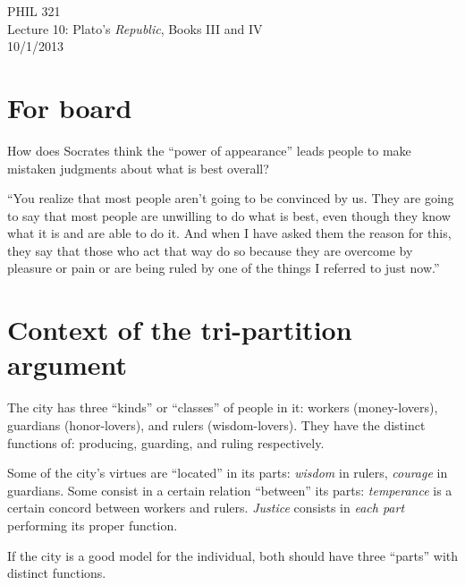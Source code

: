 \documentclass[11pt]{article}
\begin{document}
\thispagestyle{empty}
\begin{center} \LARGE{PHIL 321\\ Lecture 10: Plato's \emph{Republic}, Books III and IV}\\ \vspace*{2mm}
\large{10/1/2013}\end{center}
\thispagestyle{empty}\vspace*{3mm}
\vspace*{-8mm}

\section*{For board}

\noindent How does Socrates think the ``power of appearance'' leads people to make mistaken judgments about what is best overall?
\vspace*{2mm}

\noindent ``You realize that most people aren't going to be convinced by us. They are going to say that most people are unwilling to do what is best, even though they know what it is and are able to do it. And when I have asked them the reason for this, they say that those who act that way do so because they are overcome by pleasure or pain or are being ruled by one of the things I referred to just now.''

\section*{Context of the tri-partition argument}

\noindent The city has three ``kinds'' or ``classes'' of people in it: workers (money-lovers), guardians (honor-lovers), and rulers (wisdom-lovers). They have the distinct functions of: producing, guarding, and ruling respectively.
\vspace*{2mm}

\noindent Some of the city's virtues are ``located'' in its parts: \emph{wisdom} in rulers, \emph{courage} in guardians. Some consist in a certain relation ``between'' its parts: \emph{temperance} is a certain concord between workers and rulers. \emph{Justice} consists in \emph{each part }performing its proper function.
\vspace*{2mm}

\noindent If the city is a good model for the individual, both should have three ``parts'' with distinct functions.
\vspace*{-3mm}
\end{document}
